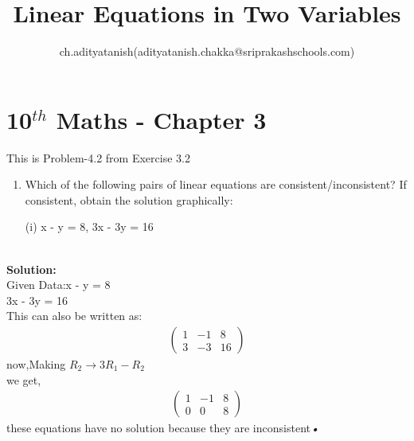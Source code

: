 \documentclass[12pt]{article}
\title{Linear Equations in Two Variables}
\author{ch.adityatanish(adityatanish.chakka@sriprakashschools.com)}
\newcommand{\myvec}[1]{\ensuremath{\begin{pmatrix}#1\end{pmatrix}}}
\newcommand{\solution}{\noindent \textbf{Solution: }}
\begin{document}
\maketitle
\section*{10$^{th}$ Maths - Chapter 3}
This is Problem-4.2 from Exercise 3.2
\begin{enumerate}
\item  Which of the following pairs of linear equations are consistent/inconsistent? If consistent, obtain the solution graphically:

(i) x - y = 8, 3x - 3y = 16 \\\\
\end{enumerate}
\solution \\
Given Data:x - y = 8\\ 
           3x - 3y = 16\\

This can also be written as:
\begin{align}
\myvec{1&-1&8\\3&-3&16}
\end{align}
now,Making $R_2 \xrightarrow\ 3R_1 - R_2$\\ 
we get,
\begin{align}
\myvec{1&-1&8\\0&0&8}
\end{align}
these equations have no solution because they are inconsistent\textsl{•}
\end{document}
